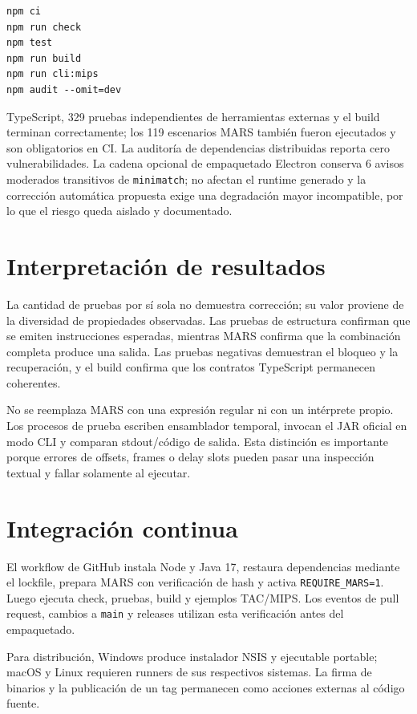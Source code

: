 \documentclass[11pt,letterpaper,oneside]{report}
\newcommand{\codigo}[1]{\texttt{#1}}
\begin{document}
\begin{verbatim}
npm ci
npm run check
npm test
npm run build
npm run cli:mips
npm audit --omit=dev
\end{verbatim}

TypeScript, 329 pruebas independientes de herramientas externas y el build terminan correctamente; los 119 escenarios MARS tambi\'en fueron ejecutados y son obligatorios en CI. La auditor\'ia de dependencias distribuidas reporta cero vulnerabilidades. La cadena opcional de empaquetado Electron conserva 6 avisos moderados transitivos de \codigo{minimatch}; no afectan el runtime generado y la correcci\'on autom\'atica propuesta exige una degradaci\'on mayor incompatible, por lo que el riesgo queda aislado y documentado.

\section{Interpretaci\'on de resultados}

La cantidad de pruebas por s\'i sola no demuestra correcci\'on; su valor proviene de la diversidad de propiedades observadas. Las pruebas de estructura confirman que se emiten instrucciones esperadas, mientras MARS confirma que la combinaci\'on completa produce una salida. Las pruebas negativas demuestran el bloqueo y la recuperaci\'on, y el build confirma que los contratos TypeScript permanecen coherentes.

No se reemplaza MARS con una expresi\'on regular ni con un int\'erprete propio. Los procesos de prueba escriben ensamblador temporal, invocan el JAR oficial en modo CLI y comparan stdout/c\'odigo de salida. Esta distinci\'on es importante porque errores de offsets, frames o delay slots pueden pasar una inspecci\'on textual y fallar solamente al ejecutar.

\section{Integraci\'on continua}

El workflow de GitHub instala Node y Java 17, restaura dependencias mediante el lockfile, prepara MARS con verificaci\'on de hash y activa \codigo{REQUIRE\_MARS=1}. Luego ejecuta check, pruebas, build y ejemplos TAC/MIPS. Los eventos de pull request, cambios a \codigo{main} y releases utilizan esta verificaci\'on antes del empaquetado.

Para distribuci\'on, Windows produce instalador NSIS y ejecutable portable; macOS y Linux requieren runners de sus respectivos sistemas. La firma de binarios y la publicaci\'on de un tag permanecen como acciones externas al c\'odigo fuente.
\end{document}
